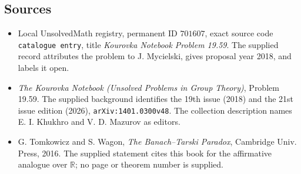 \documentclass[11pt]{article}
\newcommand{\R}{\mathbb{R}}
\begin{document}
\subsection{Sources}
\begin{itemize}
\item Local UnsolvedMath registry, permanent ID \(701607\), exact source code \texttt{catalogue entry}, title \emph{Kourovka Notebook Problem 19.59}. The supplied record attributes the problem to J. Mycielski, gives proposal year 2018, and labels it open.
\item \emph{The Kourovka Notebook (Unsolved Problems in Group Theory)}, Problem 19.59. The supplied background identifies the 19th issue (2018) and the 21st issue edition (2026), \texttt{arXiv:1401.0300v48}. The collection description names E. I. Khukhro and V. D. Mazurov as editors.
\item G. Tomkowicz and S. Wagon, \emph{The Banach--Tarski Paradox}, Cambridge Univ. Press, 2016. The supplied statement cites this book for the affirmative analogue over \(\R\); no page or theorem number is supplied.
\end{itemize}
\end{document}
